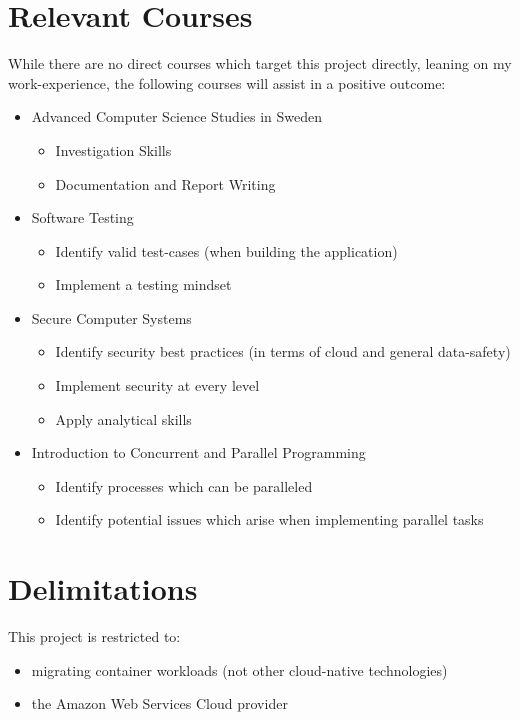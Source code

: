 \documentclass[12pt]{article}
\begin{document}
\section{Relevant Courses}
While there are no direct courses which target this project directly, leaning on my work-experience, the following courses will assist in a positive outcome:
\begin{itemize}
    \item Advanced Computer Science Studies in Sweden
    \begin{itemize}
        \item Investigation Skills 
        \item Documentation and Report Writing  
    \end{itemize}
    \item Software Testing
    \begin{itemize}
        \item Identify valid test-cases (when building the application)
        \item Implement a testing mindset 
    \end{itemize}
    \item Secure Computer Systems
    \begin{itemize}
        \item Identify security best practices (in terms of cloud and general data-safety)
        \item Implement security at every level 
        \item Apply analytical skills 
    \end{itemize}
    \item{Introduction to Concurrent and Parallel Programming}
    \begin{itemize}
        \item Identify processes which can be paralleled 
        \item Identify potential issues which arise when implementing parallel tasks
    \end{itemize}
\end{itemize}

\section{Delimitations}
This project is restricted to:
\begin{itemize}
    \item migrating container workloads (not other cloud-native technologies)
    \item the Amazon Web Services Cloud provider 
\end{itemize}
\end{document}
